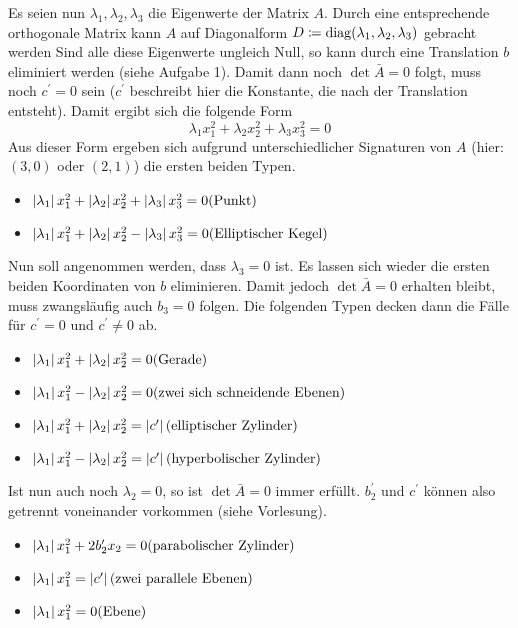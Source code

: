 		Es seien nun $\lambda_1,\lambda_2,\lambda_3$ die Eigenwerte der Matrix $A$.
		Durch eine entsprechende orthogonale Matrix kann $A$ auf Diagonalform $D\coloneqq \operatorname{diag}(\lambda_1,\lambda_2,\lambda_3)$ gebracht werden
		Sind alle diese Eigenwerte ungleich Null, so kann durch eine Translation $b$ eliminiert werden (siehe Aufgabe 1).
		Damit dann noch $\det \bar{A}=0$ folgt, muss noch $c^\prime = 0$ sein ($c^\prime$ beschreibt hier die Konstante, die nach der Translation entsteht).
		Damit ergibt sich die folgende Form
		\[ \lambda_1x_1^2 + \lambda_2x_2^2 + \lambda_3x_3^2 = 0 \]
		Aus dieser Form ergeben sich aufgrund unterschiedlicher Signaturen von $A$ (hier: $(3,0)$ oder $(2,1)$) die ersten beiden Typen.
		\begin{itemize}
			\item $\abs{\lambda_1}x_1^2 + \abs{\lambda_2}x_2^2 + \abs{\lambda_3}x_3^2 = 0 \hfill\text{(Punkt)}$
			\item $\abs{\lambda_1}x_1^2 + \abs{\lambda_2}x_2^2 - \abs{\lambda_3}x_3^2 = 0 \hfill\text{(Elliptischer Kegel)}$
		\end{itemize}

		Nun soll angenommen werden, dass $\lambda_3 = 0$ ist.
		Es lassen sich wieder die ersten beiden Koordinaten von $b$ eliminieren.
		Damit jedoch $\det\bar{A}=0$ erhalten bleibt, muss zwangsläufig auch $b_3 = 0$ folgen.
		Die folgenden Typen decken dann die Fälle für $c^\prime = 0$ und $c^\prime \neq 0$ ab.
		\begin{itemize}
			\item $\abs{\lambda_1}x_1^2 + \abs{\lambda_2}x_2^2 = 0 \hfill\text{(Gerade)}$
			\item $\abs{\lambda_1}x_1^2 - \abs{\lambda_2}x_2^2 = 0 \hfill\text{(zwei sich schneidende Ebenen)}$
			\item $\abs{\lambda_1}x_1^2 + \abs{\lambda_2}x_2^2 = \abs{c^\prime} \hfill\text{(elliptischer Zylinder)}$
			\item $\abs{\lambda_1}x_1^2 - \abs{\lambda_2}x_2^2 = \abs{c^\prime} \hfill\text{(hyperbolischer Zylinder)}$
		\end{itemize}

		Ist nun auch noch $\lambda_2 = 0$, so ist $\det\bar{A}=0$ immer erfüllt.
		$b_2^\prime$ und $c^\prime$ können also getrennt voneinander vorkommen (siehe Vorlesung).
		\begin{itemize}
			\item $\abs{\lambda_1}x_1^2 + 2b_2^\prime x_2 = 0 \hfill\text{(parabolischer Zylinder)}$
			\item $\abs{\lambda_1}x_1^2 = \abs{c^\prime} \hfill\text{(zwei parallele Ebenen)}$
			\item $\abs{\lambda_1}x_1^2 = 0 \hfill\text{(Ebene)}$
		\end{itemize}

